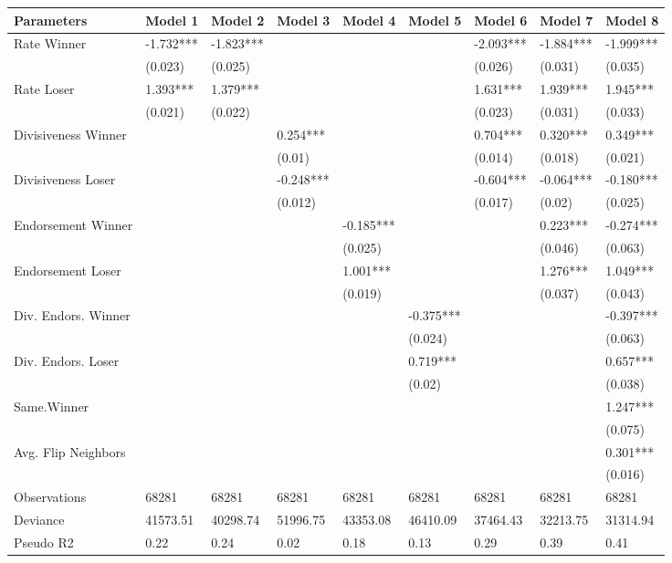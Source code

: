 
\begin{tabular}{l|l|l|l|l|l|l|l|l}
\hline
Parameters & Model 1 & Model 2 & Model 3 & Model 4 & Model 5 & Model 6 & Model 7 & Model 8\\
\hline
Rate Winner & -1.732*** & -1.823*** &  &  &  & -2.093*** & -1.884*** & -1.999***\\
\hline
 & (0.023) & (0.025) &  &  &  & (0.026) & (0.031) & (0.035)\\
\hline
Rate Loser & 1.393*** & 1.379*** &  &  &  & 1.631*** & 1.939*** & 1.945***\\
\hline
 & (0.021) & (0.022) &  &  &  & (0.023) & (0.031) & (0.033)\\
\hline
Divisiveness Winner &  &  & 0.254*** &  &  & 0.704*** & 0.320*** & 0.349***\\
\hline
 &  &  & (0.01) &  &  & (0.014) & (0.018) & (0.021)\\
\hline
Divisiveness Loser &  &  & -0.248*** &  &  & -0.604*** & -0.064*** & -0.180***\\
\hline
 &  &  & (0.012) &  &  & (0.017) & (0.02) & (0.025)\\
\hline
Endorsement Winner &  &  &  & -0.185*** &  &  & 0.223*** & -0.274***\\
\hline
 &  &  &  & (0.025) &  &  & (0.046) & (0.063)\\
\hline
Endorsement Loser &  &  &  & 1.001*** &  &  & 1.276*** & 1.049***\\
\hline
 &  &  &  & (0.019) &  &  & (0.037) & (0.043)\\
\hline
Div. Endors. Winner &  &  &  &  & -0.375*** &  &  & -0.397***\\
\hline
 &  &  &  &  & (0.024) &  &  & (0.063)\\
\hline
Div. Endors. Loser &  &  &  &  & 0.719*** &  &  & 0.657***\\
\hline
 &  &  &  &  & (0.02) &  &  & (0.038)\\
\hline
Same.Winner &  &  &  &  &  &  &  & 1.247***\\
\hline
 &  &  &  &  &  &  &  & (0.075)\\
\hline
Avg. Flip Neighbors &  &  &  &  &  &  &  & 0.301***\\
\hline
 &  &  &  &  &  &  &  & (0.016)\\
\hline
Observations & 68281 & 68281 & 68281 & 68281 & 68281 & 68281 & 68281 & 68281\\
\hline
Deviance & 41573.51 & 40298.74 & 51996.75 & 43353.08 & 46410.09 & 37464.43 & 32213.75 & 31314.94\\
\hline
Pseudo R2 & 0.22 & 0.24 & 0.02 & 0.18 & 0.13 & 0.29 & 0.39 & 0.41\\
\hline
\end{tabular}
